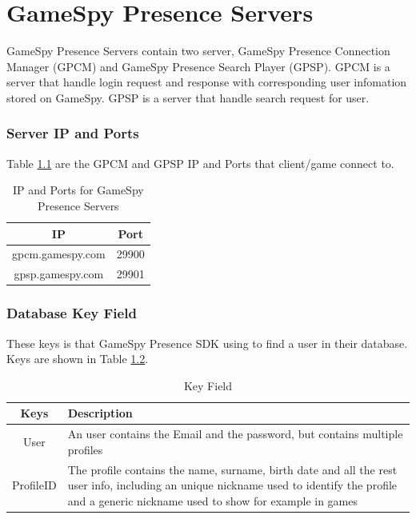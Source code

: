\documentclass[oneside,titlepage,a4paper]{report} %
\begin{document}
\chapter{GameSpy Presence Servers}
\par GameSpy Presence Servers contain two server, GameSpy Presence Connection Manager (GPCM) and GameSpy Presence Search Player (GPSP). GPCM is a server that handle login request and response with corresponding user infomation stored on GameSpy. GPSP is a server that handle search request for user.
\subsection{Server IP and Ports}
Table \ref{IP and Ports for GameSpy Presence Servers} are the GPCM and GPSP IP and Ports that client/game connect to.
\begin{table}[H]
	\centering
	\begin{tabular}{|c|c|}
		\hline 
		IP&Port  \\ 
		\hline 
		gpcm.gamespy.com&29900 \\ 		
		\hline 
	 	gpsp.gamespy.com&29901 \\
	 	\hline 
	\end{tabular} 
\caption{IP and Ports for GameSpy Presence Servers}
\label{IP and Ports for GameSpy Presence Servers}

\end{table}

\subsection{Database Key Field}
These keys is that GameSpy Presence SDK using to find a user in their database. Keys are shown in Table \ref{Key Field}.

\begin{table}[H]
	\centering
	\begin{tabular}{|c|>{\centering\arraybackslash}p{8cm}|}
		\hline 
		Keys& Description  \\ 
		\hline 
		User & An user contains the Email and the password, but contains multiple profiles \\ 		
		\hline 
		ProfileID & The profile contains the name, surname, birth date and all the rest user info, including
		an unique nickname used to identify the profile and a generic nickname used to show for example in
		games \\
		\hline 
	\end{tabular} 
	\caption{Key Field}
	\label{Key Field}	
\end{table}
\end{document}
